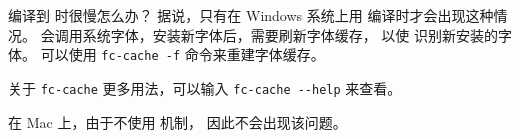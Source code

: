 \begin{myQA}{编译到  时很慢怎么办？}
	据说，只有在 Windows 系统上用  编译时才会出现这种情况。
	 会调用系统字体，安装新字体后，需要刷新字体缓存，
	以使  识别新安装的字体。
	可以使用 \verb|fc-cache -f| 命令来重建字体缓存。
	
	关于 \verb|fc-cache| 更多用法，可以输入 \verb|fc-cache --help| 来查看。
	
	在 Mac 上，由于不使用  机制，
	因此不会出现该问题。
	
\end{myQA}


